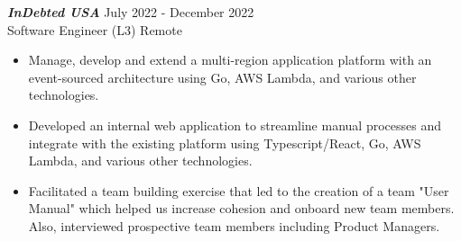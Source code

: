 {\sl \textbf{InDebted USA}} \hfill July 2022 - December 2022 \\ Software Engineer (L3) \hfill Remote
\begin{itemize}
    \item Manage, develop and extend a multi-region application platform with an event-sourced architecture using Go, AWS Lambda, and various other technologies.
    \item Developed an internal web application to streamline manual processes and integrate with the existing platform using Typescript/React, Go, AWS Lambda, and various other technologies.
    \item Facilitated a team building exercise that led to the creation of a team "User Manual" which helped us increase cohesion and onboard new team members. Also, interviewed prospective team members including Product Managers.
\end{itemize}
